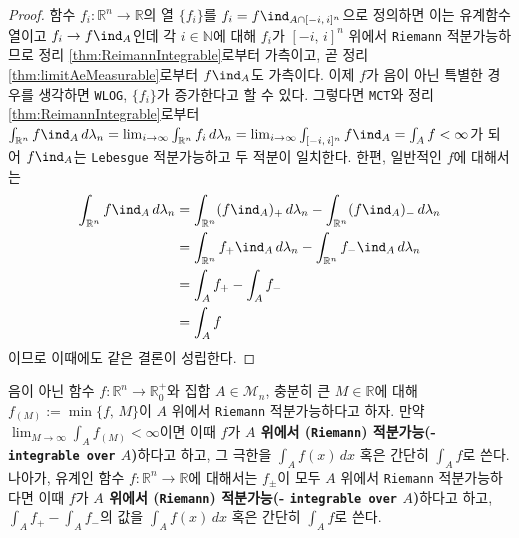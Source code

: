 \begin{proof}
    함수 $f_i:\mathbb{R}^n\to\mathbb{R}$의 열 $\{f_i\}$를 $f_i=f\ind_{A\cap[-i,\,i]^n}$으로 정의하면 이는 유계함수열이고 $f_i\to f\ind_A$인데 각 $i\in\mathbb{N}$에 대해 $f_i$가 $[-i,\,i]^n$ 위에서 \texttt{Riemann} 적분가능하므로 정리 \ref{thm:ReimannIntegrable}로부터 가측이고, 곧 정리 \ref{thm:limitAeMeasurable}로부터 $f\ind_A$도 가측이다. 이제 $f$가 음이 아닌 특별한 경우를 생각하면 \texttt{WLOG}, $\{f_i\}$가 증가한다고 할 수 있다. 그렇다면 \texttt{MCT}와 정리 \ref{thm:ReimannIntegrable}로부터 $\int_{\mathbb{R}^n}f\ind_A\,d\lambda_n=\lim_{i\to\infty}\int_{\mathbb{R}^n}f_i\,d\lambda_n=\lim_{i\to\infty}\int_{[-i,\,i]^n}f\ind_A=\int_Af<\infty$가 되어 $f\ind_A$는 \texttt{Lebesgue} 적분가능하고 두 적분이 일치한다. 한편, 일반적인 $f$에 대해서는 
    \begin{align*}
        \int_{\mathbb{R}^n}f\ind_A\,d\lambda_n&=\int_{\mathbb{R}^n}(f\ind_A)_+\,d\lambda_n-\int_{\mathbb{R}^n}(f\ind_A)_-\,d\lambda_n\\
        &=\int_{\mathbb{R}^n}f_+\ind_A\,d\lambda_n-\int_{\mathbb{R}^n}f_-\ind_A\,d\lambda_n\\
        &=\int_Af_+-\int_Af_-\\
        &=\int_Af
    \end{align*}
    이므로 이때에도 같은 결론이 성립한다.
\end{proof}

\begin{definition}
    음이 아닌 함수 $f:\mathbb{R}^n\to\mathbb{R}^+_0$와 집합 $A\in\mathcal{M}_n$, 충분히 큰 $M\in\mathbb{R}$에 대해 $f_{(M)}:=\min\{f,\,M\}$이 $A$ 위에서 \texttt{Riemann} 적분가능하다고 하자. 만약 $\lim_{M\to\infty}\int_Af_{(M)}<\infty$이면 이때 $f$가 \textbf{$A$ 위에서 (\texttt{Riemann}) 적분가능(- \texttt{integrable over} $A$)}하다고 하고, 그 극한을 $\int_Af(x)\,dx$ 혹은 간단히 $\int_Af$로 쓴다. 나아가, 유계인 함수 $f:\mathbb{R}^n\to\mathbb{R}$에 대해서는 $f_\pm$이 모두 $A$ 위에서 \texttt{Riemann} 적분가능하다면 이때 $f$가 \textbf{$A$ 위에서 (\texttt{Riemann}) 적분가능(- \texttt{integrable over} $A$)}하다고 하고, $\int_Af_+-\int_Af_-$의 값을 $\int_Af(x)\,dx$ 혹은 간단히 $\int_Af$로 쓴다.
\end{definition}

